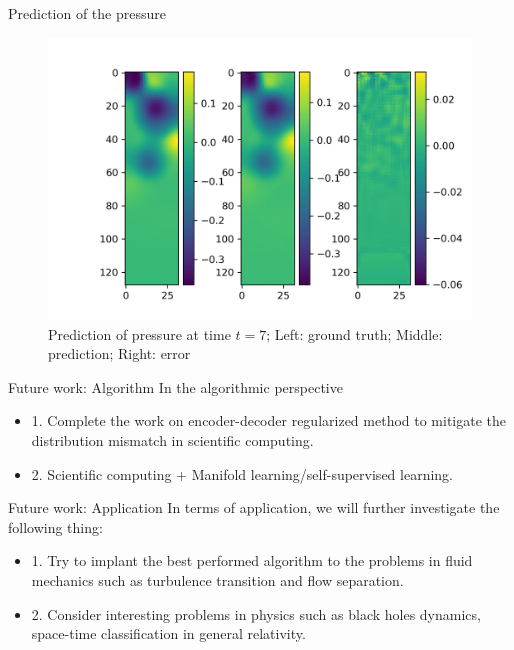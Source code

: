\documentclass{beamer}
\begin{document}
\begin{frame}{Prediction of the pressure}
	\begin{figure}[H]
          \centering
          \centerline{\includegraphics[width=0.9\linewidth]{fig/ns_p.jpg}}
          \caption{Prediction of pressure at time $t=7$; Left: ground truth;
					Middle: prediction; Right: error}
\end{figure}
\end{frame}


\begin{frame}{Future work: Algorithm}
In the algorithmic perspective
	\begin{itemize}
		\item 1. Complete the work on encoder-decoder regularized method to mitigate the
		 distribution mismatch in scientific computing.
		\item 2. Scientific computing + Manifold learning/self-supervised learning.
	\end{itemize}

\end{frame}


\begin{frame}{Future work: Application}
	In terms of application, we will further investigate the following thing:
	\begin{itemize}
		\item 1. Try to implant the best performed algorithm to the problems in fluid
		 mechanics such as turbulence transition and flow separation.
		\item 2. Consider interesting problems in physics such as black holes dynamics,
		 space-time classification in general relativity.
	\end{itemize}

\end{frame}
\end{document}
